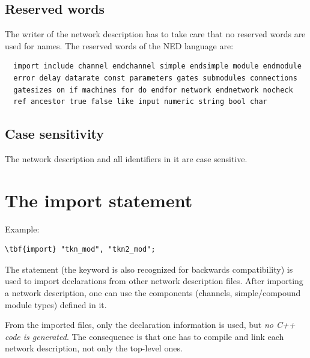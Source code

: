 \subsection{Reserved words}


The writer of the network description has to take care that no
reserved words are used for names. The reserved words of the
NED language are:
\begin{verbatim}
  import include channel endchannel simple endsimple module endmodule
  error delay datarate const parameters gates submodules connections
  gatesizes on if machines for do endfor network endnetwork nocheck
  ref ancestor true false like input numeric string bool char
\end{verbatim}




\subsection{Case sensitivity}


The network description and all identifiers in it are case sensitive.



\section{The import statement}


Example:


\begin{Verbatim}[commandchars=\\\{\}]
\tbf{import} "tkn_mod", "tkn2_mod";
\end{Verbatim}


The  statement (the
 keyword is also recognized for
backwards compatibility) is used to import declarations from other
network description files. After importing a network description, one
can use the components (channels, simple/compound
module types) defined in it.


From the imported files, only the declaration information is used, but
\textit{no C++ code is generated}. The consequence is that one has to
compile and link each network description,
not only the top-level ones.


